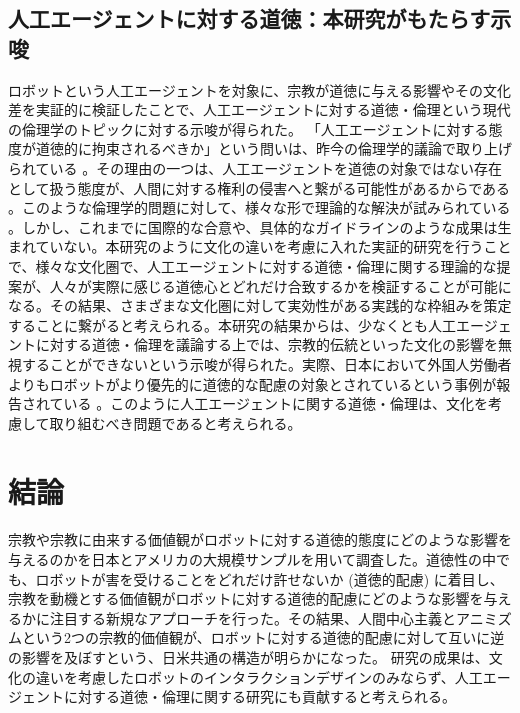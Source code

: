 \documentclass[a4j,12pt]{jreport}
\begin{document}
% 


\section{人工エージェントに対する道徳：本研究がもたらす示唆}
ロボットという人工エージェントを対象に、宗教が道徳に与える影響やその文化差を実証的に検証したことで、人工エージェントに対する道徳・倫理という現代の倫理学のトピックに対する示唆が得られた。
「人工エージェントに対する態度が道徳的に拘束されるべきか」という問いは、昨今の倫理学的議論で取り上げられている\cite{whitby} 。その理由の一つは、人工エージェントを道徳の対象ではない存在として扱う態度が、人間に対する権利の侵害へと繋がる可能性があるからである\cite{sex} 。このような倫理学的問題に対して、様々な形で理論的な解決が試みられている\cite{coeck, danaha} 。しかし、これまでに国際的な合意や、具体的なガイドラインのような成果は生まれていない。本研究のように文化の違いを考慮に入れた実証的研究を行うことで、様々な文化圏で、人工エージェントに対する道徳・倫理に関する理論的な提案が、人々が実際に感じる道徳心とどれだけ合致するかを検証することが可能になる。その結果、さまざまな文化圏に対して実効性がある実践的な枠組みを策定することに繋がると考えられる。本研究の結果からは、少なくとも人工エージェントに対する道徳・倫理を議論する上では、宗教的伝統といった文化の影響を無視することができないという示唆が得られた。実際、日本において外国人労働者よりもロボットがより優先的に道徳的な配慮の対象とされているという事例が報告されている\cite{immig} 。このように人工エージェントに関する道徳・倫理は、文化を考慮して取り組むべき問題であると考えられる。




\newpage
\chapter{結論}
宗教や宗教に由来する価値観がロボットに対する道徳的態度にどのような影響を与えるのかを日本とアメリカの大規模サンプルを用いて調査した。道徳性の中でも、ロボットが害を受けることをどれだけ許せないか (道徳的配慮) に着目し、宗教を動機とする価値観がロボットに対する道徳的配慮にどのような影響を与えるかに注目する新規なアプローチを行った。その結果、人間中心主義とアニミズムという2つの宗教的価値観が、ロボットに対する道徳的配慮に対して互いに逆の影響を及ぼすという、日米共通の構造が明らかになった。
研究の成果は、文化の違いを考慮したロボットのインタラクションデザインのみならず、人工エージェントに対する道徳・倫理に関する研究にも貢献すると考えられる。
\end{document}
